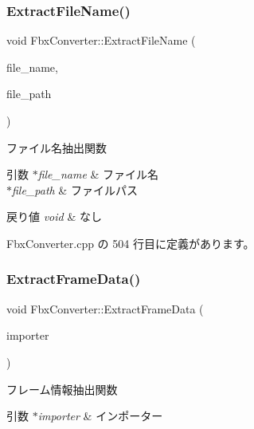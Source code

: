 \subsubsection{\texorpdfstring{Extract\+File\+Name()}{ExtractFileName()}}
{\footnotesize\ttfamily void Fbx\+Converter\+::\+Extract\+File\+Name (\begin{DoxyParamCaption}\item[{std\+::string $\ast$}]{file\+\_\+name,  }\item[{std\+::string $\ast$}]{file\+\_\+path }\end{DoxyParamCaption})\hspace{0.3cm}{\ttfamily [private]}}



ファイル名抽出関数 


\begin{DoxyParams}{引数}
{\em $\ast$file\+\_\+name} & ファイル名 \\
\hline
{\em $\ast$file\+\_\+path} & ファイルパス \\
\hline
\end{DoxyParams}

\begin{DoxyRetVals}{戻り値}
{\em void} & なし \\
\hline
\end{DoxyRetVals}


 Fbx\+Converter.\+cpp の 504 行目に定義があります。

\mbox{\label{class_fbx_converter_a0f6070933510e57b4a781d97d46f7406}} 
\subsubsection{\texorpdfstring{Extract\+Frame\+Data()}{ExtractFrameData()}}
{\footnotesize\ttfamily void Fbx\+Converter\+::\+Extract\+Frame\+Data (\begin{DoxyParamCaption}\item[{Fbx\+Importer $\ast$}]{importer }\end{DoxyParamCaption})\hspace{0.3cm}{\ttfamily [private]}}



フレーム情報抽出関数 


\begin{DoxyParams}{引数}
{\em $\ast$importer} & インポーター \\
\hline
\end{DoxyParams}

